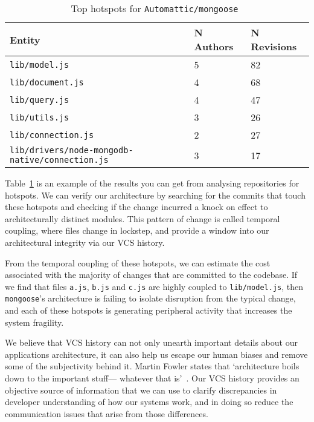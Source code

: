 \documentclass[11pt]{article}
\begin{document}
\begin{table}
  \begin{tabular}{ | l | l | l | }
    \hline
    \textbf{Entity} & \textbf{N Authors} & \textbf{N Revisions} \\
    \hline \hline
    \texttt{lib/model.js} & 5 & 82 \\ \hline
    \texttt{lib/document.js} & 4 & 68 \\ \hline
    \texttt{lib/query.js} & 4 & 47 \\ \hline
    \texttt{lib/utils.js} & 3 & 26 \\ \hline
    \texttt{lib/connection.js} & 2 & 27 \\ \hline
    \texttt{lib/drivers/node-mongodb-native/connection.js} & 3 & 17 \\
    \hline
  \end{tabular}
  \caption{Top hotspots for \texttt{Automattic/mongoose}~\cite{mongoose}}
  \label{table:mongooseHotspots}
\end{table}

Table~\ref{table:mongooseHotspots} is an example of the results you can get from
analysing repositories for hotspots. We can verify our architecture by searching
for the commits that touch these hotspots and checking if the change incurred a
knock on effect to architecturally distinct modules. This pattern of change is
called temporal coupling, where files change in lockstep, and provide a window
into our architectural integrity via our VCS history.

From the temporal coupling of these hotspots, we can estimate the cost
associated with the majority of changes that are committed to the codebase.  If
we find that files \texttt{a.js}, \texttt{b.js} and \texttt{c.js} are highly
coupled to \texttt{lib/model.js}, then \texttt{mongoose}'s architecture is
failing to isolate disruption from the typical change, and each of these
hotspots is generating peripheral activity that increases the system fragility.

We believe that VCS history can not only unearth important details about our
applications architecture, it can also help us escape our human biases and
remove some of the subjectivity behind it. Martin Fowler states that
`architecture boils down to the important stuff— whatever that
is'~\cite{patternsOfEnterpriseApplicationArchitecture}. Our VCS history provides
an objective source of information that we can use to clarify discrepancies in
developer understanding of how our systems work, and in doing so reduce the
communication issues that arise from those differences.


\medskip


\newpage
\end{document}
